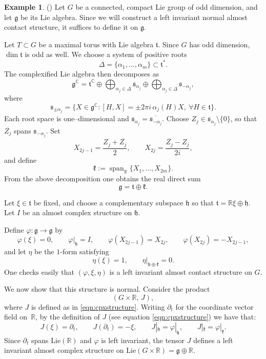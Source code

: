 \documentclass{article}
\theoremstyle{definition}
\newtheorem{ex}[thm]{Example}
\newcommand{\g}{\mathfrak{g}}
\newcommand{\R}{\mathbb{R}}
\newcommand{\C}{\mathbb{C}}
\renewcommand{\phi}{\varphi}
\numberwithin{equation}{section}
\begin{document}
\begin{ex}  \label{ex:leftinv} (\cite{CoMa})
Let $G$ be a connected, compact Lie group of odd dimension, and let
$\mathfrak g$ be its Lie algebra. Since we will construct a left invariant
normal almost contact structure, it suffices to define it on $\mathfrak g$.

Let $T\subset G$ be a maximal torus with Lie algebra $\mathfrak t$.  Since $G$ has odd dimension, $\dim\mathfrak t$ is odd as well. We choose a system of positive roots
\[
\Delta=\{\alpha_1,\dots,\alpha_m\}\subset\mathfrak t^*.
\]
The complexified Lie algebra then decomposes as
\[
\mathfrak g^\C
   = \mathfrak t^\C 
     \oplus \bigoplus_{\alpha_j\in\Delta}\mathfrak s_{\alpha_j}
     \oplus \bigoplus_{\alpha_j\in\Delta}\mathfrak s_{-\alpha_j},
\]
where
\[
\mathfrak s_{\pm\alpha_j}
   =\{X\in\mathfrak g^\C : [H,X]=\pm 2\pi i\,\alpha_j(H)X,\ \forall H\in\mathfrak t\}.
\]
Each root space is one–dimensional and 
$\mathfrak s_{\alpha_j}=\overline{\mathfrak s_{-\alpha_j}}$.  
Choose $Z_j\in\mathfrak s_{\alpha_j}\setminus\{0\}$, so that
$\overline{Z_j}$ spans $\mathfrak s_{-\alpha_j}$.  Set
\[
X_{2j-1}=\frac{Z_j+\overline{Z_j}}{2},\qquad  
X_{2j}=\frac{\overline{Z_j}-Z_j}{2i},
\]
and define
\[
\mathfrak k := \operatorname{span}_{\R}\{X_1,\dots,X_{2m}\}.
\]
From the above decomposition one obtains the real direct sum
\[
\mathfrak g = \mathfrak t \oplus \mathfrak k.
\]

Let $\xi\in\mathfrak t$ be fixed, and choose a complementary subspace
$\mathfrak h$ so that $\mathfrak t=\R\xi\oplus\mathfrak h$.  
Let $I$ be an almost complex structure on $\mathfrak h$.

Define $\phi\colon\mathfrak g\to\mathfrak g$ by
\[
\phi(\xi)=0,\qquad
\phi|_{\mathfrak h}=I,\qquad
\phi(X_{2j-1})=X_{2j},\qquad
\phi(X_{2j})=-X_{2j-1},
\]
and let $\eta$ be the $1$-form satisfying
\[
\eta(\xi)=1,\qquad \eta|_{\mathfrak h\oplus\mathfrak k}=0.
\]
One checks easily that $(\phi,\xi,\eta)$ is a left invariant almost contact
structure on $G$.

\medskip

We now show that this structure is normal. Consider the product
\[
(G\times\R,\,J),
\]
where $J$ is defined as in \eqref{eqn:cpxstructure}. Writing $\partial_t$ for the coordinate vector field on~$\R$, by the definition of $J$ (see equation \eqref{eqn:cpxstructure}) we have that:
\[
J(\xi)=\partial_t,\qquad
J(\partial_t)=-\xi,\qquad
J|_{\mathfrak{h}}=\phi|_{\mathfrak{h}},\qquad
J|_{\mathfrak{k}}=\phi|_{\mathfrak{k}}.
\]
Since $\partial_t$ spans $\mathrm{Lie}(\R)$ and $\phi$ is left invariant, the tensor $J$ defines a left invariant almost complex structure on $\mathrm{Lie}(G\times\R)=\g\oplus\R$. \par


\end{ex}
\end{document}
